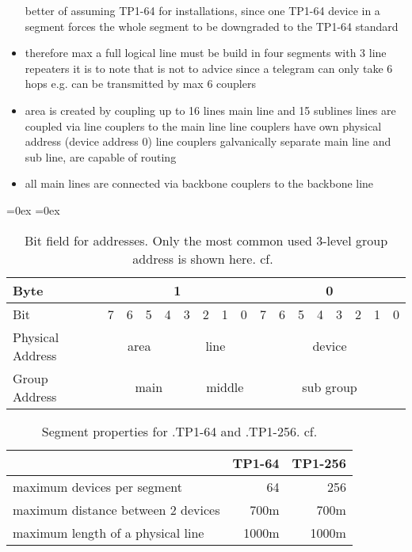 \begin{itemize}
			\subitem better of assuming TP1-64 for installations, since one TP1-64 device in a segment forces the whole segment to be downgraded to the TP1-64 standard
		\item therefore max a full logical line must be build in four segments with 3 line repeaters \parencite{Sokollik2017}
			\subitem it is to note that is not to advice since a \knx telegram can only take 6 hops
			\subitem e.g. can be transmitted by max 6 couplers
		\item area is created by coupling up to 16 lines \parencite{Sokollik2017}
			 main line and 15 sublines
			\subitem lines are coupled via line couplers to the main line
			\subitem line couplers have own physical address (device address 0) \parencite{Sokollik2017}
			\subitem line couplers galvanically separate main line and sub line, are capable of routing \parencite{Sokollik2017}
		\item all main lines are connected via backbone couplers to the backbone line \parencite{Merz2009}
		
			
	\end{itemize}
	
	\begin{table}
		\aboverulesep=0ex
		\belowrulesep=0ex
		\renewcommand{\arraystretch}{1.2}
		
		\centering
		\begin{tabular}{|l|c|c|c|c|c|c|c|c|c|c|c|c|c|c|c|c|}
			\toprule
			Byte & \multicolumn{8}{c|}{1} & \multicolumn{8}{c|}{0} \\\midrule
			Bit & 7 & 6 & 5 & 4 & 3 & 2 & 1 & 0 & 7 & 6 & 5 & 4 & 3 & 2 & 1 & 0\\\midrule
			Physical Address & \multicolumn{4}{c|}{area} & \multicolumn{4}{c|}{line} & \multicolumn{8}{c|}{device}\\\midrule
			Group Address & \multicolumn{5}{c|}{main} & \multicolumn{3}{c|}{middle} & \multicolumn{8}{c|}{sub group}\\
			\bottomrule
		\end{tabular}
		\caption[Bit field for \knx addresses]{Bit field for \knx addresses. Only the most common used 3-level group address is shown here. cf.~\textcite{Merz2009,Sokollik2017} }
		\label{tab:background:bas:knx:topo:addr}
	\end{table}
	
	\begin{table}
		\centering
		\begin{tabular}{l r r }
			 & \textbf{TP1-64} & \textbf{TP1-256} \\\toprule
			 maximum devices per segment & 64 & 256 \\
			 maximum distance between 2 devices & 700m & 700m \\
			 maximum length of a physical line & 1000m & 1000m \\
			 \bottomrule
		\end{tabular}
		\caption[Segment properties for \knx.TP1-64 and \knx.TP1-256]{Segment properties for \knx.TP1-64 and \knx.TP1-256. cf. \textcite{Sokollik2017}}
		\label{tab:background:bas:knx:topo:tpsegments}
	\end{table}
	
